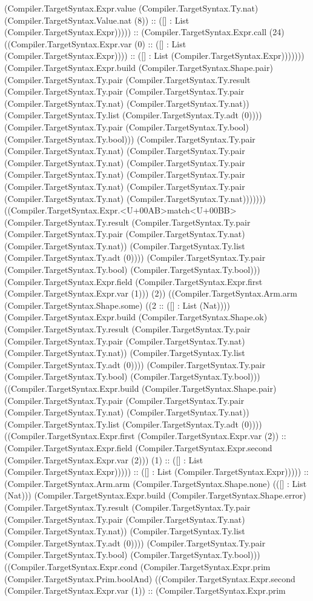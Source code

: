 \documentclass[11pt]{article}
\begin{document}
(Compiler.TargetSyntax.Expr.value (Compiler.TargetSyntax.Ty.nat) (Compiler.TargetSyntax.Value.nat (8)) :: ([] : List (Compiler.TargetSyntax.Expr))))) :: (Compiler.TargetSyntax.Expr.call (24) ((Compiler.TargetSyntax.Expr.var (0) :: ([] : List (Compiler.TargetSyntax.Expr)))) :: ([] : List (Compiler.TargetSyntax.Expr))))))) (Compiler.TargetSyntax.Expr.build (Compiler.TargetSyntax.Shape.pair) (Compiler.TargetSyntax.Ty.pair (Compiler.TargetSyntax.Ty.result (Compiler.TargetSyntax.Ty.pair (Compiler.TargetSyntax.Ty.pair (Compiler.TargetSyntax.Ty.nat) (Compiler.TargetSyntax.Ty.nat)) (Compiler.TargetSyntax.Ty.list (Compiler.TargetSyntax.Ty.adt (0)))) (Compiler.TargetSyntax.Ty.pair (Compiler.TargetSyntax.Ty.bool) (Compiler.TargetSyntax.Ty.bool))) (Compiler.TargetSyntax.Ty.pair (Compiler.TargetSyntax.Ty.nat) (Compiler.TargetSyntax.Ty.pair (Compiler.TargetSyntax.Ty.nat) (Compiler.TargetSyntax.Ty.pair (Compiler.TargetSyntax.Ty.nat) (Compiler.TargetSyntax.Ty.pair (Compiler.TargetSyntax.Ty.nat) (Compiler.TargetSyntax.Ty.pair (Compiler.TargetSyntax.Ty.nat) (Compiler.TargetSyntax.Ty.nat))))))) ((Compiler.TargetSyntax.Expr.<U+00AB>match<U+00BB> (Compiler.TargetSyntax.Ty.result (Compiler.TargetSyntax.Ty.pair (Compiler.TargetSyntax.Ty.pair (Compiler.TargetSyntax.Ty.nat) (Compiler.TargetSyntax.Ty.nat)) (Compiler.TargetSyntax.Ty.list (Compiler.TargetSyntax.Ty.adt (0)))) (Compiler.TargetSyntax.Ty.pair (Compiler.TargetSyntax.Ty.bool) (Compiler.TargetSyntax.Ty.bool))) (Compiler.TargetSyntax.Expr.field (Compiler.TargetSyntax.Expr.first (Compiler.TargetSyntax.Expr.var (1))) (2)) ((Compiler.TargetSyntax.Arm.arm (Compiler.TargetSyntax.Shape.some) ((2 :: ([] : List (Nat)))) (Compiler.TargetSyntax.Expr.build (Compiler.TargetSyntax.Shape.ok) (Compiler.TargetSyntax.Ty.result (Compiler.TargetSyntax.Ty.pair (Compiler.TargetSyntax.Ty.pair (Compiler.TargetSyntax.Ty.nat) (Compiler.TargetSyntax.Ty.nat)) (Compiler.TargetSyntax.Ty.list (Compiler.TargetSyntax.Ty.adt (0)))) (Compiler.TargetSyntax.Ty.pair (Compiler.TargetSyntax.Ty.bool) (Compiler.TargetSyntax.Ty.bool))) ((Compiler.TargetSyntax.Expr.build (Compiler.TargetSyntax.Shape.pair) (Compiler.TargetSyntax.Ty.pair (Compiler.TargetSyntax.Ty.pair (Compiler.TargetSyntax.Ty.nat) (Compiler.TargetSyntax.Ty.nat)) (Compiler.TargetSyntax.Ty.list (Compiler.TargetSyntax.Ty.adt (0)))) ((Compiler.TargetSyntax.Expr.first (Compiler.TargetSyntax.Expr.var (2)) :: (Compiler.TargetSyntax.Expr.field (Compiler.TargetSyntax.Expr.second (Compiler.TargetSyntax.Expr.var (2))) (1) :: ([] : List (Compiler.TargetSyntax.Expr))))) :: ([] : List (Compiler.TargetSyntax.Expr))))) :: (Compiler.TargetSyntax.Arm.arm (Compiler.TargetSyntax.Shape.none) (([] : List (Nat))) (Compiler.TargetSyntax.Expr.build (Compiler.TargetSyntax.Shape.error) (Compiler.TargetSyntax.Ty.result (Compiler.TargetSyntax.Ty.pair (Compiler.TargetSyntax.Ty.pair (Compiler.TargetSyntax.Ty.nat) (Compiler.TargetSyntax.Ty.nat)) (Compiler.TargetSyntax.Ty.list (Compiler.TargetSyntax.Ty.adt (0)))) (Compiler.TargetSyntax.Ty.pair (Compiler.TargetSyntax.Ty.bool) (Compiler.TargetSyntax.Ty.bool))) ((Compiler.TargetSyntax.Expr.cond (Compiler.TargetSyntax.Expr.prim (Compiler.TargetSyntax.Prim.boolAnd) ((Compiler.TargetSyntax.Expr.second (Compiler.TargetSyntax.Expr.var (1)) :: (Compiler.TargetSyntax.Expr.prim 
\end{document}
